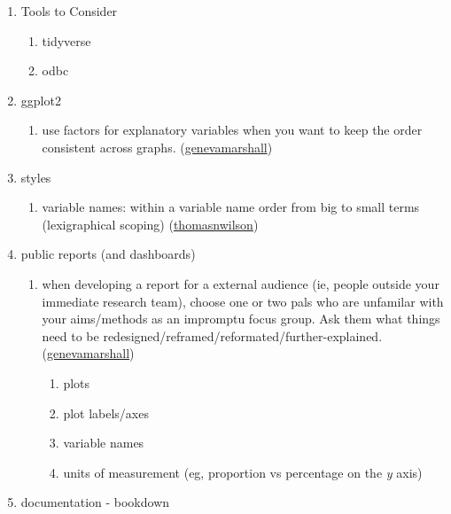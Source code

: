 \documentclass[
]{book}
\providecommand{\tightlist}{%
  \setlength{\itemsep}{0pt}\setlength{\parskip}{0pt}}
\begin{document}
\begin{enumerate}
\def\labelenumi{\arabic{enumi}.}
\item
  Tools to Consider

  \begin{enumerate}
  \def\labelenumii{\arabic{enumii}.}
  \tightlist
  \item
    tidyverse
  \item
    odbc
  \end{enumerate}
\item
  ggplot2

  \begin{enumerate}
  \def\labelenumii{\arabic{enumii}.}
  \tightlist
  \item
    use factors for explanatory variables when you want to keep the order consistent across graphs. (\href{https://github.com/genevamarshall}{genevamarshall})
  \end{enumerate}
\item
  styles

  \begin{enumerate}
  \def\labelenumii{\arabic{enumii}.}
  \tightlist
  \item
    variable names: within a variable name order from big to small terms (lexigraphical scoping) (\href{https://github.com/thomasnwilson}{thomasnwilson})
  \end{enumerate}
\item
  public reports (and dashboards)

  \begin{enumerate}
  \def\labelenumii{\arabic{enumii}.}
  \tightlist
  \item
    when developing a report for a external audience (ie, people outside your immediate research team), choose one or two pals who are unfamilar with your aims/methods as an impromptu focus group. Ask them what things need to be redesigned/reframed/reformated/further-explained. (\href{https://github.com/genevamarshall}{genevamarshall})

    \begin{enumerate}
    \def\labelenumiii{\arabic{enumiii}.}
    \tightlist
    \item
      plots
    \item
      plot labels/axes
    \item
      variable names
    \item
      units of measurement (eg, proportion vs percentage on the \emph{y} axis)
    \end{enumerate}
  \end{enumerate}
\item
  documentation - bookdown


\end{enumerate}
\end{document}
